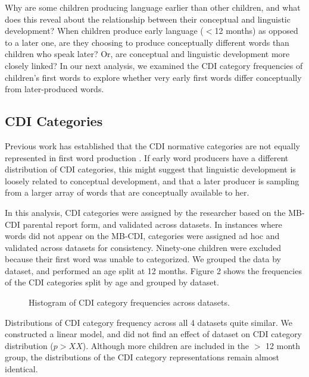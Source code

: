\documentclass[10pt,letterpaper]{article}
\begin{document}
Why are some children producing language earlier than other children, and what does this reveal about the relationship between their conceptual and linguistic development? When children produce early language ($<$12 months) as opposed to a later one, are they choosing to produce conceptually different words than children who speak later? Or, are conceptual and linguistic development more closely linked? In our next analysis, we examined the CDI category frequencies of children's first words to explore whether very early first words differ conceptually from later-produced words. 

\subsection{CDI Categories} 
Previous work has established that the CDI normative categories are not equally represented in first word production \cite{fenson1994}. If early word producers have a different distribution of CDI categories, this might suggest that linguistic development is loosely related to conceptual development, and that a later producer is sampling from a larger array of words that are conceptually available to her.

In this analysis, CDI categories were assigned by the researcher based on the MB-CDI parental report form, and validated across datasets. In instances where words did not appear on the MB-CDI, categories were assigned ad hoc and validated across datasets for consistency. Ninety-one children were excluded because their first word was unable to categorized. We grouped the data by dataset, and performed an age split at 12 months. Figure 2 shows the frequencies of the CDI categories split by age and grouped by dataset.

\begin{figure}[tb]
\caption{\label{fig:cdfs} Histogram of CDI category frequencies across datasets.}
\end{figure}

Distributions of CDI category frequency across all 4 datasets quite similar. We constructed a linear model, and did not find an effect of dataset on CDI category distribution ($p > XX$). Although more children are included in the $>$ 12 month group, the distributions of the CDI category representations remain almost identical.
\end{document}
